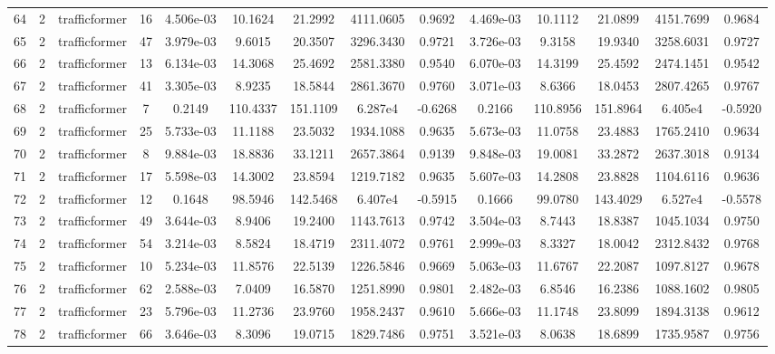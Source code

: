 \begin{landscape}
\begin{longtable}{c | c | c | c | c | c | c | c | c | c | c | c | c | c}
	64 & 2 & trafficformer & 16 & 4.506e-03 & 10.1624 & 21.2992 & 4111.0605 & 0.9692 & 4.469e-03 & 10.1112 & 21.0899 & 4151.7699 & 0.9684 \\
	65 & 2 & trafficformer & 47 & 3.979e-03 & 9.6015 & 20.3507 & 3296.3430 & 0.9721 & 3.726e-03 & 9.3158 & 19.9340 & 3258.6031 & 0.9727 \\
	66 & 2 & trafficformer & 13 & 6.134e-03 & 14.3068 & 25.4692 & 2581.3380 & 0.9540 & 6.070e-03 & 14.3199 & 25.4592 & 2474.1451 & 0.9542 \\
	67 & 2 & trafficformer & 41 & 3.305e-03 & 8.9235 & 18.5844 & 2861.3670 & 0.9760 & 3.071e-03 & 8.6366 & 18.0453 & 2807.4265 & 0.9767 \\
	68 & 2 & trafficformer & 7 & 0.2149 & 110.4337 & 151.1109 & 6.287e4 & -0.6268 & 0.2166 & 110.8956 & 151.8964 & 6.405e4 & -0.5920 \\
	69 & 2 & trafficformer & 25 & 5.733e-03 & 11.1188 & 23.5032 & 1934.1088 & 0.9635 & 5.673e-03 & 11.0758 & 23.4883 & 1765.2410 & 0.9634 \\
	70 & 2 & trafficformer & 8 & 9.884e-03 & 18.8836 & 33.1211 & 2657.3864 & 0.9139 & 9.848e-03 & 19.0081 & 33.2872 & 2637.3018 & 0.9134 \\
	71 & 2 & trafficformer & 17 & 5.598e-03 & 14.3002 & 23.8594 & 1219.7182 & 0.9635 & 5.607e-03 & 14.2808 & 23.8828 & 1104.6116 & 0.9636 \\
	72 & 2 & trafficformer & 12 & 0.1648 & 98.5946 & 142.5468 & 6.407e4 & -0.5915 & 0.1666 & 99.0780 & 143.4029 & 6.527e4 & -0.5578 \\
	73 & 2 & trafficformer & 49 & 3.644e-03 & 8.9406 & 19.2400 & 1143.7613 & 0.9742 & 3.504e-03 & 8.7443 & 18.8387 & 1045.1034 & 0.9750 \\
	74 & 2 & trafficformer & 54 & 3.214e-03 & 8.5824 & 18.4719 & 2311.4072 & 0.9761 & 2.999e-03 & 8.3327 & 18.0042 & 2312.8432 & 0.9768 \\
	75 & 2 & trafficformer & 10 & 5.234e-03 & 11.8576 & 22.5139 & 1226.5846 & 0.9669 & 5.063e-03 & 11.6767 & 22.2087 & 1097.8127 & 0.9678 \\
	76 & 2 & trafficformer & 62 & 2.588e-03 & 7.0409 & 16.5870 & 1251.8990 & 0.9801 & 2.482e-03 & 6.8546 & 16.2386 & 1088.1602 & 0.9805 \\
	77 & 2 & trafficformer & 23 & 5.796e-03 & 11.2736 & 23.9760 & 1958.2437 & 0.9610 & 5.666e-03 & 11.1748 & 23.8099 & 1894.3138 & 0.9612 \\
	78 & 2 & trafficformer & 66 & 3.646e-03 & 8.3096 & 19.0715 & 1829.7486 & 0.9751 & 3.521e-03 & 8.0638 & 18.6899 & 1735.9587 & 0.9756 \\

\end{longtable}
\end{landscape}

